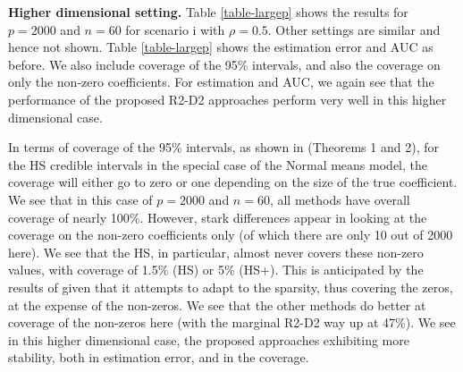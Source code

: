 \documentclass[12pt]{article}
\begin{document}
{\bf Higher dimensional setting.} Table  \ref{table-largep} shows the results for $p = 2000$ and $n=60$ for scenario i with $\rho = 0.5$. Other settings are similar and hence not shown. Table  \ref{table-largep} shows the estimation error and AUC as before. We also include coverage of the 95\% intervals, and also the coverage on only the non-zero coefficients. For estimation and AUC, we again see that the performance of the proposed R2-D2 approaches perform very well in this higher dimensional case.

In terms of coverage of the 95\% intervals, as shown in \cite{van2017uncertainty} (Theorems 1 and 2), for the HS credible intervals in the special case of the Normal means model, the coverage will either go to zero or one depending on the size of the true coefficient. We see that in this case of $p = 2000$ and $n = 60$, all methods have overall coverage of nearly 100\%. However, stark differences appear in looking at the coverage on the non-zero coefficients only (of which there are only 10 out of 2000 here). We see that the HS, in particular, almost never covers these non-zero values, with coverage of 1.5\% (HS) or 5\% (HS+). This is anticipated by the results of \cite{van2017uncertainty} given that it attempts to adapt to the sparsity, thus covering the zeros, at the expense of the non-zeros. We see that the other methods do better at coverage of the non-zeros here (with the marginal R2-D2 way up at 47\%). We see in this higher dimensional case, the proposed approaches exhibiting more stability, both in estimation error, and in the coverage.
\end{document}
